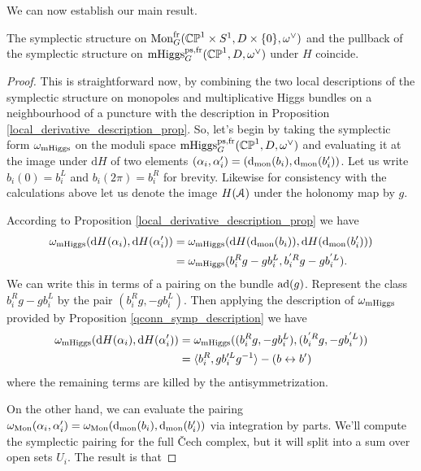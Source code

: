 \documentclass[10pt, oneside]{article}
\DeclareMathOperator{\mhiggs}{mHiggs}
\DeclareMathOperator{\mon}{Mon}
\renewcommand{\d}{\mathrm{d}}
\newcommand{\fr}{\mathrm{fr}}
\renewcommand{\ad}{\mr{ad}}
\begin{document}
We can now establish our main result.
\begin{theorem} \label{symplectic_comparison_thm}
The symplectic structure on $\mon_G^\fr(\bb{CP}^1 \times S^1,D \times\{0\},\omega^\vee)$ and the pullback of the symplectic structure on $\mhiggs_G^{\text{ps,fr}}(\bb{CP}^1,D,\omega^\vee)$ under $H$ coincide.
\end{theorem}

\begin{proof}
This is straightforward now, by combining the two local descriptions of the symplectic structure on monopoles and multiplicative Higgs bundles on a neighbourhood of a puncture with the description in Proposition \ref{local_derivative_description_prop}.  So, let's begin by taking the symplectic form $\omega_{\mathrm{mHiggs}}$ on the moduli space $\mhiggs_G^{\text{ps,fr}}(\bb{CP}^1,D,\omega^\vee)$ and evaluating it at the image under $\d H$ of two elements $(\alpha_i, \alpha'_i) = (\d_{\mr{mon}}(b_i), \d_{\mr{mon}}(b_i'))$.  Let us write $b_i(0) = b_i^L$ and $b_i(2\pi) = b_i^R$ for brevity.  Likewise for consistency with the calculations above let us denote the image $H(\mathcal{A})$ under the holonomy map by $g$.

According to Proposition \ref{local_derivative_description_prop} we have
\begin{align*}
\omega_{\mr{mHiggs}}(\d H(\alpha_i), \d H(\alpha_i')) &= \omega_{\mr{mHiggs}}(\d H(\d_{\mr{mon}}(b_i)), \d H(\d_{\mr{mon}}(b_i'))) \\
&= \omega_{\mr{mHiggs}}(b_i^Rg - gb_i^L,b_i^{'R}g - gb_i^{'L}).
\end{align*}
We can write this in terms of a pairing on the bundle $\ad(g)$.  Represent the class $b_i^Rg - gb_i^L$ by the pair $(b_i^Rg, -gb_i^L)$.  Then applying the description of $\omega_{\mathrm{mHiggs}}$ provided by Proposition \ref{qconn_symp_description} we have
\begin{align*}
\omega_{\mr{mHiggs}}(\d H(\alpha_i), \d H(\alpha_i')) &= \omega_{\mr{mHiggs}}((b_i^Rg, -gb_i^L),(b_i^{'R}g, -gb_i^{'L})) \\ 
&= \langle  b_i^R , g b_i'^L g^{-1}\rangle - (b \leftrightarrow b')
\end{align*}
where the remaining terms are killed by the antisymmetrization.

On the other hand, we can evaluate the pairing $\omega_{\mr{Mon}}(\alpha_i,\alpha'_i) = \omega_{\mr{Mon}}(\d_{\mr{mon}}(b_i),\d_{\mr{mon}}(b_i'))$ via integration by parts. We'll compute the symplectic pairing for the full \v Cech complex, but it will split into a sum over open sets $U_i$.  The result is that 
 


\end{proof}
\end{document}
